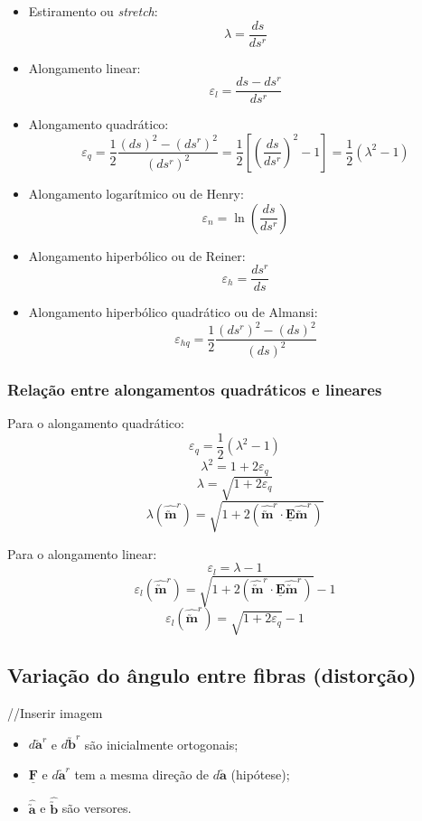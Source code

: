 	\begin{itemize}
		\item Estiramento ou \textit{stretch}:
			\[\lambda=\frac{ds}{ds^r}\]
		\item Alongamento linear:
			\[\varepsilon_l=\frac{ds-ds^r}{ds^r}\]
		\item Alongamento quadrático:
			\[\varepsilon_q=\frac{1}{2}\frac{(ds)^2-(ds^r)^2}{(ds^r)^2}=\frac{1}{2}\left[\left(\frac{ds}{ds^r}\right)^2-1\right]=\frac{1}{2}(\lambda^2-1)\]
		\item Alongamento logarítmico ou de Henry:
			\[\varepsilon_n=\ln \left(\frac{ds}{ds^r}\right)\]
		\item Alongamento hiperbólico ou de Reiner:
			\[\varepsilon_h=\frac{ds^r}{ds}\]
		\item Alongamento hiperbólico quadrático ou de Almansi:
			\[\varepsilon_{hq}=\frac{1}{2}\frac{(ds^r)^2-(ds)^2}{(ds)^2}\]
	\end{itemize}
	
	\subsubsection{Relação entre alongamentos quadráticos e lineares}
	
	Para o alongamento quadrático:
	\[\varepsilon_q=\frac{1}{2}(\lambda^2-1)\]
	\[\lambda^2=1+2\varepsilon_q\]
	\[\lambda=\sqrt{1+2\varepsilon_q}\]
	\[\lambda(\hat{\utilde{\mathbf{m}}}^r)=\sqrt{1+2(\hat{\utilde{\mathbf{m}}}^r\cdot\underline{\mathbf{E}}\hat{\utilde{\mathbf{m}}}^r)}\]
	
	Para o alongamento linear:
	\[\varepsilon_l=\lambda-1\]
	\[\varepsilon_l(\hat{\utilde{\mathbf{m}}}^r)=\sqrt{1+2(\hat{\utilde{\mathbf{m}}}^r\cdot\underline{\mathbf{E}}\hat{\utilde{\mathbf{m}}}^r)}-1\]
	\[\varepsilon_l(\hat{\utilde{\mathbf{m}}}^r)=\sqrt{1+2\varepsilon_q}-1\]
	
	\subsection{Variação do ângulo entre fibras (distorção)}
	
	//Inserir imagem
	
	\begin{itemize}
		\item $d\utilde{\mathbf{a}}^r$ e $d\utilde{\mathbf{b}}^r$ são inicialmente ortogonais;
		\item $\underline{\mathbf{F}}$ e $d\utilde{\mathbf{a}}^r$ tem a mesma direção de $d\utilde{\mathbf{a}}$ (hipótese);
		\item $\hat{\utilde{\mathbf{a}}}$ e $\hat{\utilde{\mathbf{b}}}$ são versores.
	\end{itemize}
	
